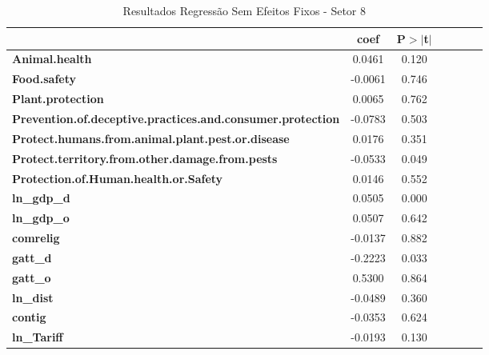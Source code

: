 \begin{table}[ht]
    \begin{center}
        \begin{tabular}{lcccccc}
            & \textbf{coef} & \textbf{P$> |$t$|$}\\
            \midrule
\textbf{Animal.health}                                             &       0.0461 &     0.120     \\
\textbf{Food.safety}                                               &      -0.0061 &     0.746     \\
\textbf{Plant.protection}                                          &       0.0065 &     0.762     \\
\textbf{Prevention.of.deceptive.practices.and.consumer.protection} &      -0.0783 &     0.503     \\
\textbf{Protect.humans.from.animal.plant.pest.or.disease}          &       0.0176 &     0.351     \\
\textbf{Protect.territory.from.other.damage.from.pests}            &      -0.0533 &     0.049     \\
\textbf{Protection.of.Human.health.or.Safety}                      &       0.0146 &     0.552     \\
\textbf{ln\_gdp\_d}                                                &       0.0505 &     0.000     \\
\textbf{ln\_gdp\_o}                                                &       0.0507 &     0.642     \\
\textbf{comrelig}                                                  &      -0.0137 &     0.882     \\
\textbf{gatt\_d}                                                   &      -0.2223 &     0.033     \\
\textbf{gatt\_o}                                                   &       0.5300 &     0.864     \\
\textbf{ln\_dist}                                                  &      -0.0489 &     0.360     \\
\textbf{contig}                                                    &      -0.0353 &     0.624     \\
\textbf{ln\_Tariff}                                                &      -0.0193 &     0.130     \\
\bottomrule
\end{tabular}
\caption{ Resultados Regressão Sem Efeitos Fixos - Setor 8}
\end{center}
\end{table}